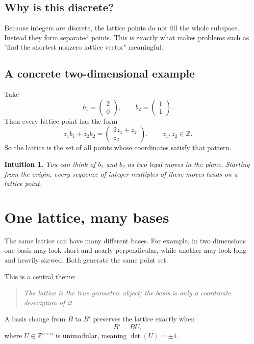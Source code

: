 \documentclass[11pt]{article}
\newtheorem*{intuition}{Intuition}
\newcommand{\Z}{\mathbb{Z}}
\begin{document}
\subsection{Why is this discrete?}
Because integers are discrete, the lattice points do not fill the whole subspace. Instead they form separated points. This is exactly what makes problems such as "find the shortest nonzero lattice vector" meaningful.

\subsection{A concrete two-dimensional example}
Take
\[
b_1=\begin{pmatrix}2\\0\end{pmatrix},
\qquad
b_2=\begin{pmatrix}1\\1\end{pmatrix}.
\]
Then every lattice point has the form
\[
z_1b_1+z_2b_2 = \begin{pmatrix}2z_1+z_2\\ z_2\end{pmatrix},
\qquad z_1,z_2\in \Z.
\]
So the lattice is the set of all points whose coordinates satisfy that pattern.

\begin{intuition}
You can think of $b_1$ and $b_2$ as two legal moves in the plane. Starting from the origin, every sequence of integer multiples of these moves lands on a lattice point.
\end{intuition}

\section{One lattice, many bases}

The same lattice can have many different bases. For example, in two dimensions one basis may look short and nearly perpendicular, while another may look long and heavily skewed. Both generate the same point set.

This is a central theme:
\begin{quote}
\emph{The lattice is the true geometric object; the basis is only a coordinate description of it.}
\end{quote}

A basis change from $B$ to $B'$ preserves the lattice exactly when
\[
B' = B U,
\]
where $U\in \Z^{n\times n}$ is unimodular, meaning $\det(U)=\pm 1$.
\end{document}
